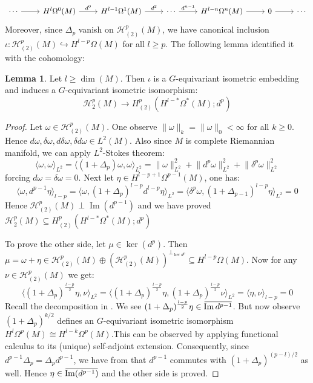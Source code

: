 \documentclass[11pt]{report}
\theoremstyle{definition}
\newtheorem{Lemma}[Def]{Lemma}
\theoremstyle{plain}
\DeclareMathOperator{\im}{Im}
\newcommand{\inj}{\hookrightarrow}
\newcommand{\overbar}[1]{\mkern 1.5mu\overline{\mkern-1.5mu#1\mkern-1.5mu}\mkern 1.5mu}
\newcommand{\brac}[1]{\langle #1 \rangle}
\renewcommand{\bar}{\overbar}
\newcommand{\norm}[1]{\lVert #1 \rVert}
\begin{document}
\begin{equation}
\begin{tikzcd}
\cdots \rar &H^l\Omega^0(M)\rar{d^0} &H^{l-1}\Omega^1(M)\rar{d^2} &\cdots \rar{d^{n-1}} &H^{l-n}\Omega^n(M)\rar &0\rar &\cdots
\end{tikzcd}
\end{equation}
Moreover, since $\Delta_p$ vanish on $\mathcal{H}_{(2)}^p(M)$, we have canonical inclusion $\iota:\mathcal{H}^p_{(2)}(M)\inj H^{l-p}\Omega(M)$ for all $l\geq p$. The following lemma identified it with the cohomology:
\begin{Lemma}\label{1.75}
	Let $l\geq \dim(M)$. Then $\iota$ is a $G$-equivariant isometric embedding and induces a $G$-equivariant isometric isomorphism:
	\begin{equation}
	\mathcal{H}^p_{2}(M)\longrightarrow H^p_{(2)}(H^{l-*}\Omega^*(M); d^p)
	\end{equation}
\end{Lemma}
\begin{proof}
	Let $\omega\in \mathcal{H}^p_{(2)}(M)$. One observe $\norm{\omega}_k=\norm{\omega}_0<\infty$ for all $k\geq 0$. Hence $d\omega, \delta\omega, d\delta\omega, \delta d\omega\in L^2(M)$. Also since $M$ is complete Riemannian manifold, we can apply $L^2$-Stokes theorem:
	\begin{equation}
	\brac{\omega, \omega}_{L^2}=\brac{(1+\Delta_p)\omega, \omega}_{L^2}=\norm{\omega}_{L^2}^2+\norm{d^p\omega}_{L^2}^2+\norm{\delta^p\omega}_{L^2}^2
	\end{equation}
	forcing $d\omega=\delta\omega=0$. Next let $\eta\in H^{l-p+1}\Omega^{p-1}(M)$, one has:
	\begin{equation*}
	\brac{\omega, d^{p-1}\eta}_{l-p}=\brac{\omega, (1+\Delta_p)^{l-p}d^{l-p}\eta}_{L^2}=\brac{\delta^p\omega, (1+\Delta_{p-1})^{l-p}\eta}_{L^2}=0
	\end{equation*}
	Hence $\mathcal{H}^p_{(2)}(M)\perp \im(d^{p-1})$ and we have proved $\mathcal{H}^p_{2}(M)\subseteq H^p_{(2)}(H^{l-*}\Omega^*(M); d^p)$
	\par To prove the other side, let $\mu\in \ker(d^p)$. Then $\mu=\omega+\eta\in \mathcal{H}^p_{(2)}(M)\oplus (\mathcal{H}^p_{(2)}(M))^{\perp_{\ker d^p}}\subseteq H^{l-p}\Omega(M)$. Now for any $\nu\in \mathcal{H}^p_{(2)}(M)$ we get:
	\begin{equation*}
	\brac{(1+\Delta_p)^{\frac{l-p}{2}}\eta, \nu}_{L^2}=\brac{(1+\Delta_p)^{\frac{l-p}{2}}\eta, (1+\Delta_p)^{\frac{l-p}{2}}\nu}_{L^2}=\brac{\eta, \nu}_{l-p}=0
	\end{equation*} 
	Recall the decomposition in . We see $(1+\Delta_p)^{\frac{l-p}{2}}\eta\in \bar{\im d^{p-1}}$. But now observe $(1+\Delta_p)^{k/2}$ defines an $G$-equivariant isometric isomorphism $H^l\Omega^p(M)\cong H^{l-k}\Omega^p(M)$.This can be observed by applying functional calculus to its (unique) self-adjoint extension. Consequently, since $d^{p-1}\Delta_p=\Delta_pd^{p-1}$, we have from  that $d^{p-1}$ commutes with $(1+\Delta_p)^{(p-l)/2}$ as well. Hence $\eta\in \bar{\im(d^{p-1})}$ and the other side is proved.
\end{proof}
\end{document}
